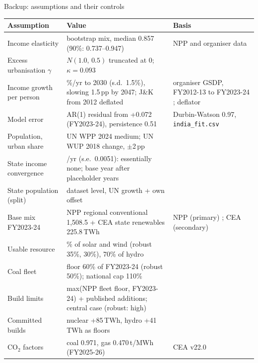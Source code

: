 \documentclass[aspectratio=169,10pt,t]{beamer}
\begin{document}
\begin{frame}[label=b2]{Backup: assumptions and their controls}
{\fontsize{6.6}{7.7}\selectfont
\renewcommand{\arraystretch}{1.0}
\begin{tabular}{@{}>{\raggedright\arraybackslash}p{2.9cm}>{\raggedright\arraybackslash}p{6.4cm}>{\raggedright\arraybackslash}p{4.3cm}@{}}
\toprule
Assumption & Value & Basis\\
\midrule
Income elasticity & bootstrap mix, median 0.857 (90\%: 0.737--0.947) & NPP and organiser data \cite{npp_dashboard,organiser_dataset}\\
Excess urbanisation $\gamma$ & $N(1.0,\,0.5)$ truncated at 0; $\kappa = 0.093$ & \cite{liddle2013population,shahbaz2016role,holtedahl2004residential}\\
Income growth per person & 4.90\%/yr to 2030 (s.d.\ 1.5\%), slowing 1.5\,pp by 2047; J\&K from 2012 deflated & organiser GSDP, FY2012-13 to FY2023-24 \cite{organiser_dataset}; deflator \cite{mospi_nas_deflator}\\
Model error & AR(1) residual from +0.072 (FY2023-24), persistence 0.51 & Durbin-Watson 0.97, \texttt{india\_fit.csv}\\
Population, urban share & UN WPP 2024 medium; UN WUP 2018 change, $\pm$2\,pp & \cite{un_wpp2024,un_wup2018}\\
State income convergence & 0.0021/yr (s.e.\ 0.0051): essentially none; base year after placeholder years & \cite{organiser_dataset,barro1992convergence}\\
State population (split) & dataset level, UN growth + own offset & \cite{organiser_dataset,un_wpp2024}\\
Base mix FY2023-24 & NPP regional conventional 1,508.5 + CEA state renewables 225.8\,TWh & NPP (primary) \cite{npp_18col}; CEA (secondary) \cite{cea_general_review_2025}\\
Usable resource & 25\% of solar and wind (robust 35\%, 30\%), 70\% of hydro & \cite{mnre_restats_2425,cea_hydro_status}\\
Coal fleet & floor 60\% of FY2023-24 (robust 50\%); national cap 110\% & \cite{npp_18col,cea_nep2023}\\
Build limits & max(NPP fleet floor, FY2023-24) + published additions; central case (robust: high) & \cite{cea_nep2023,cea_flex_2024,niti_2026_power,dae_lsq497_2025}\\
Committed builds & nuclear +85\,TWh, hydro +41\,TWh as floors & \cite{pib_dae_2026,cea_hydro_status}\\
CO$_2$ factors & coal 0.971, gas 0.470\,t/MWh (FY2025-26) & CEA v22.0 \cite{cea_co2_v22}\\

\end{tabular}}
\end{frame}
\end{document}
